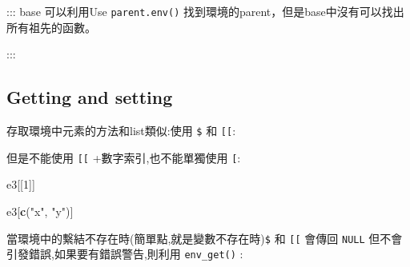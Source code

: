 \documentclass[]{book}
\newenvironment{Shaded}{\begin{snugshade}}{\end{snugshade}}
\newcommand{\KeywordTok}[1]{\textcolor[rgb]{0.13,0.29,0.53}{\textbf{#1}}}
\newcommand{\DataTypeTok}[1]{\textcolor[rgb]{0.13,0.29,0.53}{#1}}
\newcommand{\DecValTok}[1]{\textcolor[rgb]{0.00,0.00,0.81}{#1}}
\newcommand{\StringTok}[1]{\textcolor[rgb]{0.31,0.60,0.02}{#1}}
\newcommand{\OperatorTok}[1]{\textcolor[rgb]{0.81,0.36,0.00}{\textbf{#1}}}
\newcommand{\NormalTok}[1]{#1}
\theoremstyle{definition}
\theoremstyle{definition}
\theoremstyle{definition}
\theoremstyle{remark}
\begin{document}
::: base 可以利用Use \texttt{parent.env()}
找到環境的parent，但是base中沒有可以找出所有祖先的函數。

:::

\subsection{Getting and setting}\label{getting-and-setting}

存取環境中元素的方法和list類似:使用 \texttt{\$} 和 \texttt{{[}{[}}:

\begin{Shaded}
\end{Shaded}

\begin{Shaded}
\end{Shaded}

但是不能使用 \texttt{{[}{[}} +數字索引,也不能單獨使用 \texttt{{[}}:

\begin{Shaded}
\begin{Highlighting}[]
\NormalTok{e3[[}\DecValTok{1}\NormalTok{]]}
\end{Highlighting}
\end{Shaded}

\begin{Shaded}
\begin{Highlighting}[]
\NormalTok{e3[}\KeywordTok{c}\NormalTok{(}\StringTok{"x"}\NormalTok{, }\StringTok{"y"}\NormalTok{)]}
\end{Highlighting}
\end{Shaded}

當環境中的繫結不存在時(簡單點,就是變數不存在時)\texttt{\$} 和
\texttt{{[}{[}} 會傳回 \texttt{NULL}
但不會引發錯誤,如果要有錯誤警告,則利用 \texttt{env\_get()} :

\begin{Shaded}
\end{Shaded}
\end{document}
